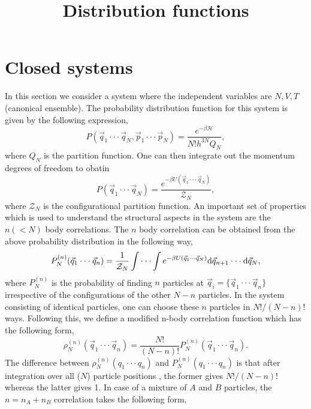 \documentclass[a4paper]{article}
\title{Distribution functions}
\date{}
\begin{document}
\maketitle
\section{Closed systems}
In this section we consider a system where the independent variables are $N,V,T$ (canonical ensemble). The probability distribution function for this system is given by the following expression,
\begin{equation}
P(\vec{q}_{1}\cdot\cdot\cdot \vec{q}_{N},\vec{p}_{1}\cdot\cdot\cdot \vec{p}_{N})=\frac{e^{-\beta \mathcal{H}}}{N!h^{3N}Q_{N}},
\end{equation}
where $Q_{N}$ is the partition function. One can then integrate out the momentum degrees of freedom to obatin
\begin{equation}
P(\vec{q}_{1}\cdot\cdot\cdot \vec{q}_{N})=\frac{e^{-\beta U(\vec{q}_{1}\cdot\cdot\cdot \vec{q}_{N})}}{\mathcal{Z}_{N}},
\end{equation}
where $\mathcal{Z}_{N}$ is the configurational partition function. An important set of properties which is used to understand the structural aspects in the system are the $n (<N)$ body correlations. The $n$ body correlation can be obtained from the above probability distribution in the following way,
\begin{equation}
P^{(n)}_{N}(\vec{q}_{1}\cdot\cdot\cdot \vec{q}_{n})=\frac{1}{\mathcal{Z}_{N}}\int\cdot\cdot\cdot\int e^{-\beta U(\vec{q}_{1}\cdot\cdot\cdot \vec{q}_{N})}{\rm d}\vec{q}_{n+1}\cdot\cdot\cdot{\rm d}\vec{q}_{N},
\end{equation}
where $P^{(n)}_{N}$ is the probability of finding $n$ particles at $\vec{q}_{i}=\{\vec{q}_{1}\cdot\cdot\cdot\vec{q}_{n}\}$ irrespective of the configurations of the other $N-n$ particles. In the system consisting of identical particles, one can choose these $n$ particles in $N!/(N-n)!$ ways. Following this, we define a modified n-body correlation function which has the following form,
\begin{equation}\label{eq:density}
\rho^{(n)}_{N}(\vec{q}_{1}\cdot\cdot\cdot \vec{q}_{n})=\frac{N!}{\left(N-n\right)!}P^{(n)}_{N}(\vec{q}_{1}\cdot\cdot\cdot \vec{q}_{n}).
\end{equation}
The difference between $\rho^{(n)}_{N}(q_{1}\cdot\cdot\cdot q_{n})$ and $P^{(n)}_{N}(q_{1}\cdot\cdot\cdot q_{n})$ is that after integration over all ($N$) particle positions , the former gives $N!/(N-n)!$ whereas the latter gives 1. In case of a mixture of $A$ and $B$ particles, the $n=n_{A}+n_{B}$ correlation takes the following form, 
\end{document}
